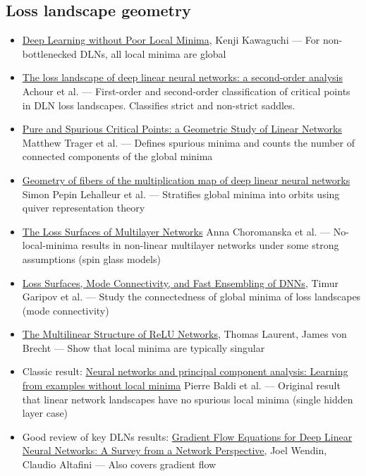 \documentclass[11pt]{article}
\begin{document}
\subsection*{Loss landscape geometry}
\begin{itemize}
  \item \href{https://arxiv.org/abs/1605.07110}{Deep Learning without Poor Local Minima}, Kenji Kawaguchi --- For non-bottlenecked DLNs, all local minima are global
  \item \href{https://arxiv.org/abs/2107.13289}{The loss landscape of deep linear neural networks: a second-order analysis} Achour et al. --- First-order and second-order classification of critical points in DLN loss landscapes. Classifies strict and non-strict saddles.
  \item \href{https://arxiv.org/abs/1910.01671}{Pure and Spurious Critical Points: a Geometric Study of Linear Networks} Matthew Trager et al. --- Defines spurious minima and counts the number of connected components of the global minima
  \item \href{https://arxiv.org/abs/2411.19920}{Geometry of fibers of the multiplication map of deep linear neural networks} Simon Pepin Lehalleur et al. --- Stratifies global minima into orbits using quiver representation theory
  \item \href{https://arxiv.org/abs/1412.0233}{The Loss Surfaces of Multilayer Networks} Anna Choromanska et al. --- No-local-minima results in non-linear multilayer networks under some strong assumptions (spin glass models)
  \item \href{https://arxiv.org/abs/1802.10026}{Loss Surfaces, Mode Connectivity, and Fast Ensembling of DNNs}, Timur Garipov et al. --- Study the connectedness of global minima of loss landscapes (mode connectivity)
  \item \href{https://arxiv.org/abs/1712.10132}{The Multilinear Structure of ReLU Networks}, Thomas Laurent, James von Brecht --- Show that local minima are typically singular
  \item Classic result: \href{https://www.sciencedirect.com/science/article/abs/pii/0893608089900142}{Neural networks and principal component analysis: Learning from examples without local minima} Pierre Baldi et al. --- Original result that linear network landscapes have no spurious local minima (single hidden layer case)
  \item Good review of key DLNs results: \href{https://arxiv.org/abs/2511.10362}{Gradient Flow Equations for Deep Linear Neural Networks: A Survey from a Network Perspective}, Joel Wendin, Claudio Altafini --- Also covers gradient flow
\end{itemize}
\end{document}
